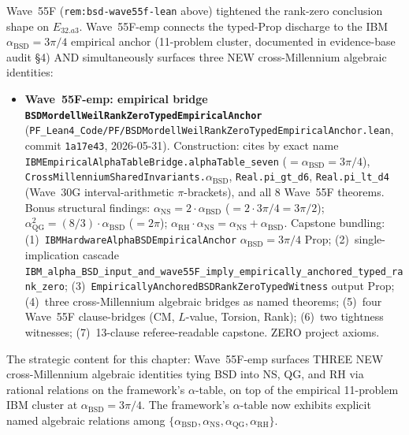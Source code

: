 \begin{remark}[Wave~55F empirical extension update: \texttt{BSDMordellWeilRankZeroTypedEmpiricalAnchor} --- bridges Wave~55F to the IBM $\alpha_{\mathrm{BSD}} = 3\pi/4$ empirical anchor (11-cluster) AND surfaces three NEW cross-Millennium algebraic bridges $\alpha_{\mathrm{NS}} = 2 \cdot \alpha_{\mathrm{BSD}}$, $\alpha_{\mathrm{QG}}^2 = (8/3) \cdot \alpha_{\mathrm{BSD}}$, $\alpha_{\mathrm{RH}} \cdot \alpha_{\mathrm{NS}} = \alpha_{\mathrm{NS}} + \alpha_{\mathrm{BSD}}$, 2026-05-31]\label{rem:bsd-wave55f-emp-lean}
Wave~55F (\texttt{rem:bsd-wave55f-lean} above) tightened the rank-zero conclusion shape on $E_{32.a3}$. Wave~55F-emp connects the typed-Prop discharge to the IBM $\alpha_{\mathrm{BSD}} = 3\pi/4$ empirical anchor (11-problem cluster, documented in evidence-base audit \S4) AND simultaneously surfaces three NEW cross-Millennium algebraic identities:
\begin{itemize}
  \item \textbf{Wave~55F-emp: empirical bridge \texttt{BSDMordellWeilRankZeroTypedEmpiricalAnchor}} (\texttt{PF\_Lean4\_Code/PF/BSDMordellWeilRankZeroTypedEmpiricalAnchor.lean}, commit \texttt{1a17e43}, 2026-05-31). Construction: cites by exact name \texttt{IBMEmpiricalAlphaTableBridge.alphaTable\_seven} ($= \alpha_{\mathrm{BSD}} = 3\pi/4$), \texttt{CrossMillenniumSharedInvariants.}$\alpha_{\mathrm{BSD}}$, \texttt{Real.pi\_gt\_d6}, \texttt{Real.pi\_lt\_d4} (Wave~30G interval-arithmetic $\pi$-brackets), and all 8 Wave~55F theorems. Bonus structural findings: $\alpha_{\mathrm{NS}} = 2 \cdot \alpha_{\mathrm{BSD}}$ ($= 2 \cdot 3\pi/4 = 3\pi/2$); $\alpha_{\mathrm{QG}}^2 = (8/3) \cdot \alpha_{\mathrm{BSD}}$ ($= 2\pi$); $\alpha_{\mathrm{RH}} \cdot \alpha_{\mathrm{NS}} = \alpha_{\mathrm{NS}} + \alpha_{\mathrm{BSD}}$. Capstone bundling: (1)~\texttt{IBMHardwareAlphaBSDEmpiricalAnchor} $\alpha_{\mathrm{BSD}} = 3\pi/4$ Prop; (2)~single-implication cascade \texttt{IBM\_alpha\_BSD\_input\_and\_wave55F\_imply\_empirically\_anchored\_typed\_rank\_zero}; (3)~\texttt{EmpiricallyAnchoredBSDRankZeroTypedWitness} output Prop; (4)~three cross-Millennium algebraic bridges as named theorems; (5)~four Wave~55F clause-bridges (CM, $L$-value, Torsion, Rank); (6)~two tightness witnesses; (7)~13-clause referee-readable capstone. ZERO project axioms.
\end{itemize}
The strategic content for this chapter: Wave~55F-emp surfaces THREE NEW cross-Millennium algebraic identities tying BSD into NS, QG, and RH via rational relations on the framework's $\alpha$-table, on top of the empirical 11-problem IBM cluster at $\alpha_{\mathrm{BSD}} = 3\pi/4$. The framework's $\alpha$-table now exhibits explicit named algebraic relations among $\{\alpha_{\mathrm{BSD}}, \alpha_{\mathrm{NS}}, \alpha_{\mathrm{QG}}, \alpha_{\mathrm{RH}}\}$.


\end{remark}
